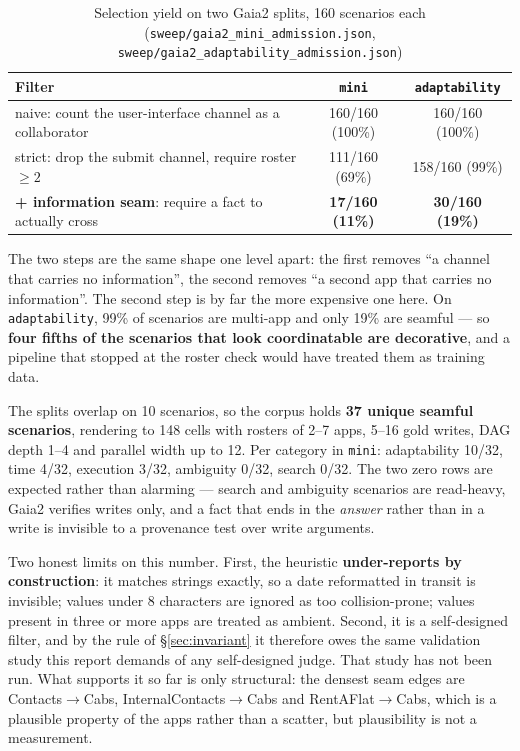 \documentclass[11pt,a4paper]{article}
\begin{document}
\begin{table}[H]
\centering
\small
\caption{Selection yield on two Gaia2 splits, 160 scenarios each (\texttt{sweep/gaia2\_mini\_admission.json}, \texttt{sweep/gaia2\_adaptability\_admission.json})}
\label{tab:selection}
\begin{tabularx}{\textwidth}{X c c}
\toprule
Filter & \texttt{mini} & \texttt{adaptability}\\
\midrule
naive: count the user-interface channel as a collaborator & 160/160 (100\%) & 160/160 (100\%)\\
strict: drop the submit channel, require roster $\geq2$ & 111/160 (69\%) & 158/160 (99\%)\\
\textbf{+ information seam}: require a fact to actually cross & \textbf{17/160 (11\%)} & \textbf{30/160 (19\%)}\\
\bottomrule
\end{tabularx}
\end{table}

The two steps are the same shape one level apart: the first removes ``a channel that carries no information'', the second removes ``a second app that carries no information''. The second step is by far the more expensive one here. On \texttt{adaptability}, 99\% of scenarios are multi-app and only 19\% are seamful --- so \textbf{four fifths of the scenarios that look coordinatable are decorative}, and a pipeline that stopped at the roster check would have treated them as training data.

The splits overlap on 10 scenarios, so the corpus holds \textbf{37 unique seamful scenarios}, rendering to 148 cells with rosters of 2--7 apps, 5--16 gold writes, DAG depth 1--4 and parallel width up to 12. Per category in \texttt{mini}: adaptability 10/32, time 4/32, execution 3/32, ambiguity 0/32, search 0/32. The two zero rows are expected rather than alarming --- search and ambiguity scenarios are read-heavy, Gaia2 verifies writes only, and a fact that ends in the \emph{answer} rather than in a write is invisible to a provenance test over write arguments.

Two honest limits on this number. First, the heuristic \textbf{under-reports by construction}: it matches strings exactly, so a date reformatted in transit is invisible; values under 8 characters are ignored as too collision-prone; values present in three or more apps are treated as ambient. Second, it is a self-designed filter, and by the rule of \S\ref{sec:invariant} it therefore owes the same validation study this report demands of any self-designed judge. That study has not been run. What supports it so far is only structural: the densest seam edges are Contacts$\rightarrow$Cabs, InternalContacts$\rightarrow$Cabs and RentAFlat$\rightarrow$Cabs, which is a plausible property of the apps rather than a scatter, but plausibility is not a measurement.
\end{document}
